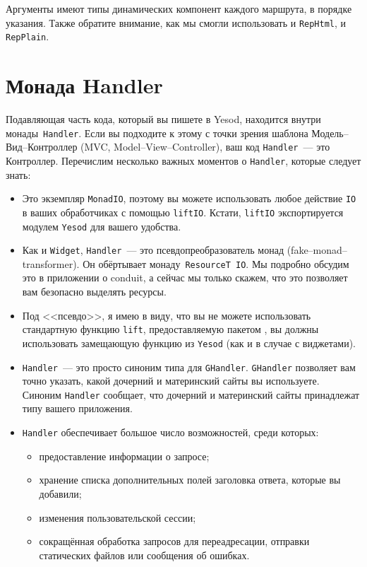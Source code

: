 Аргументы имеют типы динамических компонент каждого маршрута, в порядке
указания. Также обратите внимание, как мы смогли использовать и
\lstinline!RepHtml!, и \lstinline!RepPlain!.

\section{Монада Handler}\label{sec:handler-monad}
Подавляющая часть кода, который вы пишете в Yesod, находится внутри
монады~\lstinline!Handler!. Если вы подходите к этому с точки зрения
шаблона Модель--Вид--Контроллер (MVC, Model--View--Controller), ваш код
\lstinline!Handler!~--- это Контроллер. Перечислим несколько важных
моментов о \lstinline!Handler!, которые следует знать:
\begin{itemize}
\item Это экземпляр \lstinline!MonadIO!, поэтому вы можете
  использовать любое действие \lstinline!IO! в ваших обработчиках с
  помощью \lstinline!liftIO!. Кстати, \lstinline!liftIO! экспортируется
  модулем \lstinline!Yesod! для вашего удобства.
\item Как и \lstinline!Widget!, \lstinline!Handler!~--- это
  псевдопреобразователь монад 
  (fake--monad--transformer). Он обёртывает
  монаду~\lstinline!ResourceT IO!. Мы подробно обсудим это в
  {приложении о conduit}, а
  сейчас мы только скажем, что это позволяет вам безопасно выделять
  ресурсы.
\item Под <<псевдо>>, я имею в виду, что вы не можете использовать
  стандартную функцию \lstinline!lift!, предоставляемую пакетом
  ,
  вы должны использовать замещающую функцию из \lstinline!Yesod! (как и в
  случае с виджетами).
\item \lstinline!Handler!~--- это просто синоним типа для
  \lstinline!GHandler!. \lstinline!GHandler! позволяет вам точно
  указать, какой дочерний и материнский сайты вы используете. Синоним
  \lstinline!Handler! сообщает, что дочерний и материнский сайты 
  принадлежат типу вашего приложения.
\item \lstinline!Handler! обеспечивает большое число возможностей, среди которых:
\begin{itemize}
\item предоставление информации о запросе;
\item хранение списка дополнительных полей заголовка ответа, которые
  вы добавили;
\item изменения пользовательской сессии;
\item сокращённая обработка запросов для переадресации, отправки
  статических файлов или сообщения об ошибках.
\end{itemize}
\end{itemize}


